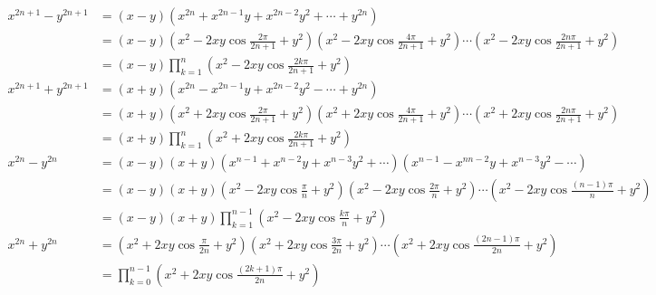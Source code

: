 \begin{align*}
  x^{2n+1}-y^{2n+1}&=(x-y)(x^{2n}+x^{2n-1}y+x^{2n-2}y^{2}+\cdots+y^{2n}) \\
    &=(x-y)\left(x^{2}-2xy\cos \frac{2\pi}{2n+1}+y^{2}\right)\left(x^{2}-2xy\cos \frac{4\pi}{2n+1}+y^{2}\right)\cdots\left(x^{2}-2xy\cos \frac{2n\pi}{2n+1}+y^{2}\right) \\
    &=(x-y)\prod_{k=1}^{n}\left(x^{2}-2xy\cos \frac{2k\pi}{2n+1}+y^{2}\right) \\
  x^{2n+1}+y^{2n+1}&=(x+y)(x^{2n}-x^{2n-1}y+x^{2n-2}y^{2}-\cdots+y^{2n}) \\
    &=(x+y)\left(x^{2}+2xy\cos \frac{2\pi}{2n+1}+y^{2}\right)\left(x^{2}+2xy\cos \frac{4\pi}{2n+1}+y^{2}\right)\cdots\left(x^{2}+2xy\cos \frac{2n\pi}{2n+1}+y^{2}\right) \\
    &=(x+y)\prod_{k=1}^{n}\left(x^{2}+2xy\cos \frac{2k\pi}{2n+1}+y^{2}\right) \\
  x^{2n}-y^{2n}&=(x-y)(x+y)(x^{n-1}+x^{n-2}y+x^{n-3}y^{2}+\cdots)(x^{n-1}-x^{n  n-2}y+x^{n-3}y^{2}-\cdots) \\
    &=(x-y)(x+y)\left(x^{2}-2xy\cos \frac{\pi}{n}+y^{2}\right)\left(x^{2}-2xy\cos \frac{2\pi}{n}+y^{2}\right)\cdots\left(x^{2}-2xy\cos \frac{(n-1)\pi}{n}+y^{2}\right)\\
    &=(x-y)(x+y)\prod_{k=1}^{n-1}\left(x^{2}-2xy\cos \frac{k\pi}{n}+y^{2}\right)\\
  x^{2n}+y^{2n}&=\left(x^{2}+2xy\cos \frac{\pi}{2n}+y^{2}\right)\left(x^{2}+2xy\cos           \frac{3\pi}{2n}+y^{2}\right)\cdots\left(x^{2}+2xy\cos \frac{(2n-1)\pi}{2n}+y^{2}\right) \\
  &=\prod_{k=0}^{n-1}\left(x^{2}+2xy\cos \frac{(2k+1)\pi}{2n}+y^{2}\right)
\end{align*}



